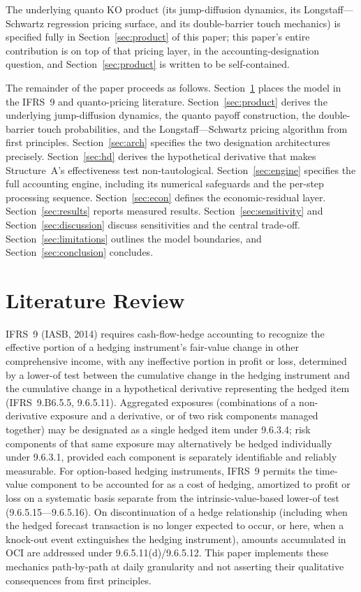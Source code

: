 \documentclass[11pt,a4paper]{article}
\begin{document}
The underlying quanto KO product (its jump-diffusion dynamics, its Longstaff---Schwartz regression pricing surface, and its double-barrier touch mechanics) is specified fully in Section~\ref{sec:product} of this paper; this paper's entire contribution is on top of that pricing layer, in the accounting-designation question, and Section~\ref{sec:product} is written to be self-contained.

The remainder of the paper proceeds as follows. Section~\ref{sec:litreview} places the model in the IFRS~9 and quanto-pricing literature. Section~\ref{sec:product} derives the underlying jump-diffusion dynamics, the quanto payoff construction, the double-barrier touch probabilities, and the Longstaff---Schwartz pricing algorithm from first principles. Section~\ref{sec:arch} specifies the two designation architectures precisely. Section~\ref{sec:hd} derives the hypothetical derivative that makes Structure~A's effectiveness test non-tautological. Section~\ref{sec:engine} specifies the full accounting engine, including its numerical safeguards and the per-step processing sequence. Section~\ref{sec:econ} defines the economic-residual layer. Section~\ref{sec:results} reports measured results. Section~\ref{sec:sensitivity} and Section~\ref{sec:discussion} discuss sensitivities and the central trade-off. Section~\ref{sec:limitations} outlines the model boundaries, and Section~\ref{sec:conclusion} concludes.

\section{Literature Review}
\label{sec:litreview}

IFRS~9 (IASB, 2014) requires cash-flow-hedge accounting to recognize the effective portion of a hedging instrument's fair-value change in other comprehensive income, with any ineffective portion in profit or loss, determined by a lower-of test between the cumulative change in the hedging instrument and the cumulative change in a hypothetical derivative representing the hedged item (IFRS~9.B6.5.5, 9.6.5.11). Aggregated exposures (combinations of a non-derivative exposure and a derivative, or of two risk components managed together) may be designated as a single hedged item under 9.6.3.4; risk components of that same exposure may alternatively be hedged individually under 9.6.3.1, provided each component is separately identifiable and reliably measurable. For option-based hedging instruments, IFRS~9 permits the time-value component to be accounted for as a cost of hedging, amortized to profit or loss on a systematic basis separate from the intrinsic-value-based lower-of test (9.6.5.15---9.6.5.16). On discontinuation of a hedge relationship (including when the hedged forecast transaction is no longer expected to occur, or here, when a knock-out event extinguishes the hedging instrument), amounts accumulated in OCI are addressed under 9.6.5.11(d)/9.6.5.12. This paper implements these mechanics path-by-path at daily granularity and not asserting their qualitative consequences from first principles.
\end{document}
